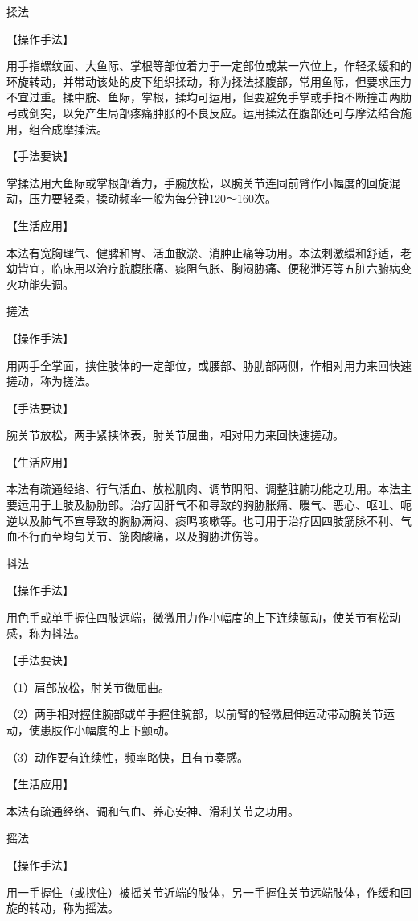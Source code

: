 \documentclass[12pt,UTF8,openany]{ctexbook}
\begin{document}
揉法

【操作手法】

用手指螺纹面、大鱼际、掌根等部位着力于一定部位或某一穴位上，作轻柔缓和的环旋转动，并带动该处的皮下组织揉动，称为揉法揉腹部，常用鱼际，但要求压力不宜过重。揉中脘、鱼际，掌根，揉均可运用，但要避免手掌或手指不断撞击两肋弓或剑突，以免产生局部疼痛肿胀的不良反应。运用揉法在腹部还可与摩法结合施用，组合成摩揉法。

【手法要诀】

掌揉法用大鱼际或掌根部着力，手腕放松，以腕关节连同前臂作小幅度的回旋混动，压力要轻柔，揉动频率一般为每分钟120～160次。

【生活应用】

本法有宽胸理气、健脾和胃、活血散淤、消肿止痛等功用。本法刺激缓和舒适，老幼皆宜，临床用以治疗脘腹胀痛、痰阻气胀、胸闷胁痛、便秘泄泻等五脏六腑病变火功能失调。

搓法

【操作手法】

用两手全掌面，挟住肢体的一定部位，或腰部、胁肋部两侧，作相对用力来回快速搓动，称为搓法。

【手法要诀】

腕关节放松，两手紧挟体表，肘关节屈曲，相对用力来回快速搓动。

【生活应用】

本法有疏通经络、行气活血、放松肌肉、调节阴阳、调整脏腑功能之功用。本法主要运用于上肢及胁肋部。治疗因肝气不和导致的胸胁胀痛、暖气、恶心、呕吐、呃逆以及肺气不宣导致的胸胁满闷、痰鸣咳嗽等。也可用于治疗因四肢筋脉不利、气血不行而至均匀关节、筋肉酸痛，以及胸胁进伤等。

抖法

【操作手法】

用色手或单手握住四肢远端，微微用力作小幅度的上下连续颤动，使关节有松动感，称为抖法。

【手法要诀】

（1）肩部放松，肘关节微屈曲。

（2）两手相对握住腕部或单手握住腕部，以前臂的轻微屈伸运动带动腕关节运动，使患肢作小幅度的上下颤动。

（3）动作要有连续性，频率略快，且有节奏感。

【生活应用】

本法有疏通经络、调和气血、养心安神、滑利关节之功用。

摇法

【操作手法】

用一手握住（或挟住）被摇关节近端的肢体，另一手握住关节远端肢体，作缓和回旋的转动，称为摇法。
\end{document}
